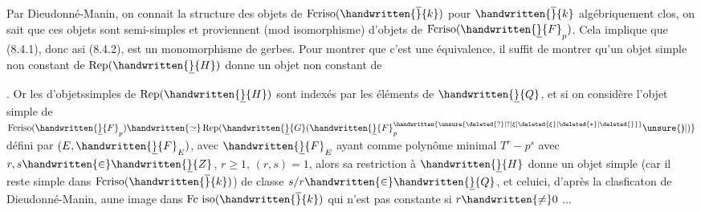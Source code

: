 Par Dieudonné-Manin, on connait la structure des objets de $\operatorname{Fcriso}(\handwritten{\overline}{k})$ pour $\handwritten{\overline}{k}$ algébriquement clos, on sait que ces objets sont semi-simples et proviennent (mod isomorphisme) d'objets de $\operatorname{Fcriso}(\handwritten{\underline}{F}_p)$. Cela implique que (8.4.1), donc asi (8.4.2), est un monomorphisme de gerbes. Pour montrer que c'est une équivalence, il suffit de montrer qu'un objet simple non constant de  $\operatorname{Rep}(\handwritten{\underline}{H})$ donne un objet non constant de . Or les  d'objetssimples de $\operatorname{Rep}(\handwritten{\underline}{H})$ sont indexés par les éléments de $\handwritten{\underline}{Q}$, et si on considère l'objet simple de $\operatorname{Fcriso}(\handwritten{\underline}{F}_p)\handwritten{\simeq}\operatorname{Rep}(\handwritten{\underline}{G}(\handwritten{\underline}{F}_p^{\handwritten{\unsure{\deleted{?}|?|\xi|\deleted{\xi}|\deleted{*}|\deleted{\overline{\vphantom{F}}}}}}\unsure{\rlap{)})|)}$ défini par $(E,\handwritten{\underline}{F}_E)$, avec $\handwritten{\underline}{F}_E$ ayant comme polynôme minimal $T^r-p^s$ avec $r,s\handwritten{\in}\handwritten{\underline}{Z}$, $r\geq1$, $(r,s)=1$, alors sa restriction à $\handwritten{\underline}{H}$ donne un objet simple  (car il reste simple dans $\operatorname{Fcriso}(\handwritten{\overline}{k})$) de classe $s/r\handwritten{\in}\handwritten{\underline}{Q}$, et celui\unsure{\rlap{(}\handwritten{-}|\handwritten{-}}ci, d'après la clasficaton de Dieudonné-Manin,  aune image dans $\operatorname{Fc\ iso}(\handwritten{\overline}{k})$ qui n'est pas constante si $r\handwritten{\ne}0$ ...

